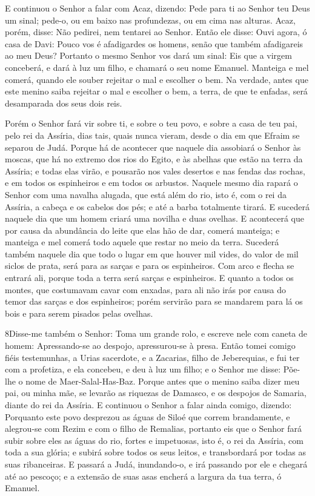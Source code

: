 E continuou o Senhor a falar com Acaz, dizendo: Pede para
ti ao Senhor teu Deus um sinal; pede-o, ou em baixo nas profundezas,
ou em cima nas alturas. Acaz, porém, disse: Não pedirei, nem
tentarei ao Senhor. Então ele disse: Ouvi agora, ó casa de
Davi: Pouco vos é afadigardes os homens, senão que também
afadigareis ao meu Deus? Portanto o mesmo Senhor vos dará um
sinal: Eis que a virgem conceberá, e dará à luz um filho, e chamará
o seu nome Emanuel. Manteiga e mel comerá, quando ele souber
rejeitar o mal e escolher o bem. Na verdade, antes que este
menino saiba rejeitar o mal e escolher o bem, a terra, de que te
enfadas, será desamparada dos seus dois reis.

Porém o Senhor fará vir sobre ti, e sobre o teu povo, e sobre a
casa de teu pai, pelo rei da Assíria, dias tais, quais nunca vieram,
desde o dia em que Efraim se separou de Judá. Porque há de
acontecer que naquele dia assobiará o Senhor às moscas, que há no
extremo dos rios do Egito, e às abelhas que estão na terra da
Assíria; e todas elas virão, e pousarão nos vales desertos e
nas fendas das rochas, e em todos os espinheiros e em todos os
arbustos. Naquele mesmo dia rapará o Senhor com uma navalha
alugada, que está além do rio, isto é, com o rei da Assíria, a
cabeça e os cabelos dos pés; e até a barba totalmente tirará.
E sucederá naquele dia que um homem criará uma novilha e duas
ovelhas. E acontecerá que por causa da abundância do leite
que elas hão de dar, comerá manteiga; e manteiga e mel comerá todo
aquele que restar no meio da terra. Sucederá também naquele
dia que todo o lugar em que houver mil vides, do valor de mil siclos
de prata, será para as sarças e para os espinheiros. Com arco
e flecha se entrará ali, porque toda a terra será sarças e
espinheiros. E quanto a todos os montes, que costumavam cavar
com enxadas, para ali não irás por causa do temor das sarças e dos
espinheiros; porém servirão para se mandarem para lá os bois e para
serem pisados pelas ovelhas.

\medskip

\lettrine{8}{}Disse-me também o Senhor: Toma um grande rolo, e
escreve nele com caneta de homem: Apressando-se ao despojo,
apressurou-se à presa. Então tomei comigo fiéis testemunhas, a
Urias sacerdote, e a Zacarias, filho de Jeberequias, e fui ter
com a profetiza, e ela concebeu, e deu à luz um filho; e o Senhor me
disse: Põe-lhe o nome de Maer-Salal-Has-Baz. Porque antes que o
menino saiba dizer meu pai, ou minha mãe, se levarão as riquezas de
Damasco, e os despojos de Samaria, diante do rei da Assíria. E
continuou o Senhor a falar ainda comigo, dizendo: Porquanto este
povo desprezou as águas de Siloé que correm brandamente, e
alegrou-se com Rezim e com o filho de Remalias, portanto eis que
o Senhor fará subir sobre eles as águas do rio, fortes e impetuosas,
isto é, o rei da Assíria, com toda a sua glória; e subirá sobre
todos os seus leitos, e transbordará por todas as suas ribanceiras.
E passará a Judá, inundando-o, e irá passando por ele e chegará
até ao pescoço; e a extensão de suas asas encherá a largura da tua
terra, ó Emanuel.

